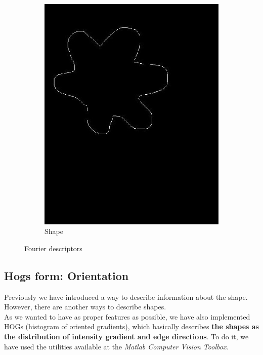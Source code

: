 \documentclass[11]{article}
\begin{document}
\begin{figure}[H]
\begin{subfigure}[t]{0.45\textwidth}
    \includegraphics[scale=0.25]{images/shape.jpg}
    \caption{Shape}
    \label{fourier2}
    \end{subfigure}
    \label{fourier}
    \caption{Fourier descriptors}
\end{figure}


\subsection{Hogs form: Orientation}
Previously we have introduced a way to describe information about the shape. However, there are another ways to describe shapes. 
\\
As we wanted to have as proper features as possible, we have also implemented HOGs (histogram of oriented gradients), which basically describes \textbf{the shapes as the distribution of intensity gradient and edge directions}. To do it, we have used the utilities available at the \textit{Matlab Computer Vision Toolbox}.
\end{document}
